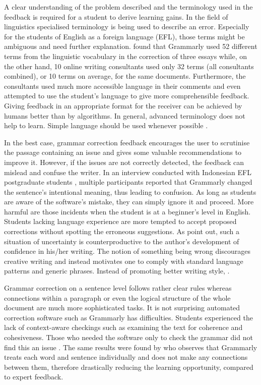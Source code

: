\documentclass[runningheads]{llncs}
\let\OldTextregistered\textregistered
\renewcommand{\textregistered}{\OldTextregistered\xspace}
\begin{document}
A clear understanding of the problem described and the terminology used in the feedback is required for a student to derive learning gains. In the field of linguistics specialised terminology is being used to describe an error. Especially for the students of English as a foreign language (EFL), those terms might be ambiguous and need further explanation. \textcite{dembsey_closing_2017} found that Grammarly\textregistered used 52 different terms from the linguistic vocabulary in the correction of three essays while, on the other hand, 10 online writing consultants used only 32 terms (all consultants combined), or 10 terms on average, for the same documents. Furthermore, the consultants used much more accessible language in their comments and even attempted to use the student's language to give more comprehensible feedback. Giving feedback in an appropriate format for the receiver can be achieved by humans better than by algorithms. In general, advanced terminology does not help to learn. Simple language should be used whenever possible \citep{dembsey_closing_2017}.

In the best case, grammar correction feedback encourages the user to scrutinise the passage containing an issue and gives some valuable recommendations to improve it. However, if the issues are not correctly detected, the feedback can mislead and confuse the writer. In an interview conducted with Indonesian EFL postgraduate students \citep{nova_utilizing_2018}, multiple participants reported that Grammarly\textregistered changed the sentence's intentional meaning, thus leading to confusion. As long as students are aware of the software's mistake, they can simply ignore it and proceed. More harmful are those incidents when the student is at a beginner's level in English. Students lacking language experience are more tempted to accept proposed corrections without spotting the erroneous suggestions. As \textcite{vojak_new_2011} point out, such a situation of uncertainty is counterproductive to the author's development of confidence in his/her writing. The notion of something being wrong discourages creative writing and instead motivates one to comply with standard language patterns and generic phrases. Instead of promoting better writing style, \citeauthor{vojak_new_2011} . 

Grammar correction on a sentence level follows rather clear rules whereas connections within a paragraph or even the logical structure of the whole document are much more sophisticated tasks. It is not surprising automated correction software such as Grammarly\textregistered has difficulties. Students experienced the lack of context-aware checkings such as examining the text for coherence and cohesiveness. Those who needed the software only to check the grammar did not find this an issue \citep{nova_utilizing_2018}. The same results were found by \textcite{dembsey_closing_2017} who observes that Grammarly\textregistered treats each word and sentence individually and does not make any connections between them, therefore drastically reducing the learning opportunity, compared to expert feedback.
\end{document}
